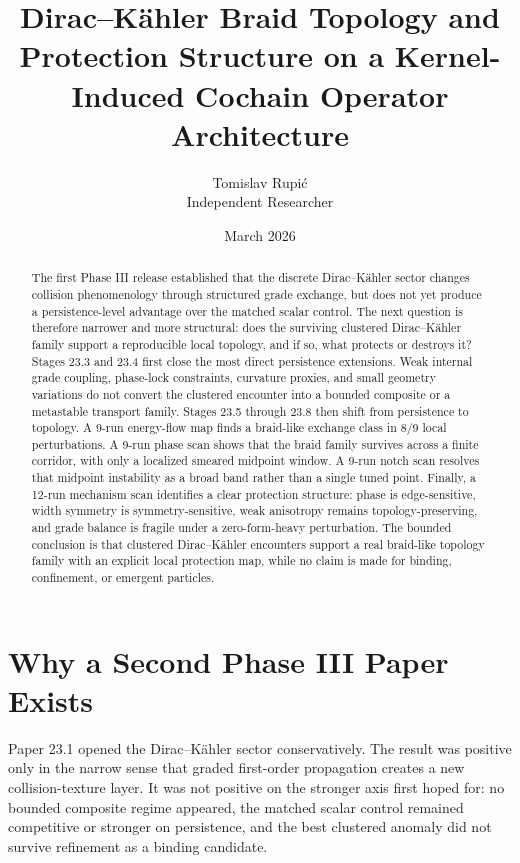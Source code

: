 \documentclass[11pt]{article}
\title{Dirac--K\"ahler Braid Topology and Protection Structure on a Kernel-Induced Cochain Operator Architecture}
\author{Tomislav Rupi\'c \\ Independent Researcher}
\date{March 2026}
\begin{document}
\maketitle

\begin{abstract}
The first Phase III release established that the discrete Dirac--K\"ahler sector changes collision phenomenology through structured grade exchange, but does not yet produce a persistence-level advantage over the matched scalar control. The next question is therefore narrower and more structural: does the surviving clustered Dirac--K\"ahler family support a reproducible local topology, and if so, what protects or destroys it? Stages 23.3 and 23.4 first close the most direct persistence extensions. Weak internal grade coupling, phase-lock constraints, curvature proxies, and small geometry variations do not convert the clustered encounter into a bounded composite or a metastable transport family. Stages 23.5 through 23.8 then shift from persistence to topology. A 9-run energy-flow map finds a braid-like exchange class in $8/9$ local perturbations. A 9-run phase scan shows that the braid family survives across a finite corridor, with only a localized smeared midpoint window. A 9-run notch scan resolves that midpoint instability as a broad band rather than a single tuned point. Finally, a 12-run mechanism scan identifies a clear protection structure: phase is edge-sensitive, width symmetry is symmetry-sensitive, weak anisotropy remains topology-preserving, and grade balance is fragile under a zero-form-heavy perturbation. The bounded conclusion is that clustered Dirac--K\"ahler encounters support a real braid-like topology family with an explicit local protection map, while no claim is made for binding, confinement, or emergent particles.
\end{abstract}

\section{Why a Second Phase III Paper Exists}

Paper 23.1 opened the Dirac--K\"ahler sector conservatively. The result was positive only in the narrow sense that graded first-order propagation creates a new collision-texture layer. It was not positive on the stronger axis first hoped for: no bounded composite regime appeared, the matched scalar control remained competitive or stronger on persistence, and the best clustered anomaly did not survive refinement as a binding candidate.
\end{document}

